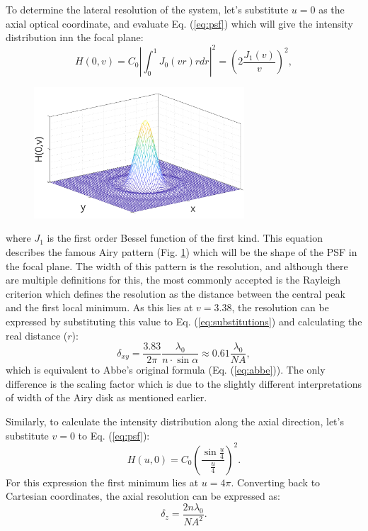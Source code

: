     To determine the lateral resolution of the system, let's substitute $u=0$ as the axial optical coordinate, and evaluate Eq. (\ref{eq:psf}) which will give the intensity distribution inn the focal plane:
    \begin{equation}
      H(0,v) = C_0 \left| \int_0^1 J_0(vr)rdr \right|^2 = \left(2\frac{J_1(v)}{v} \right) ^2,
      \label{eq:airy}
    \end{equation}
    \begin{figure}
      \centering
      \includegraphics[width=0.7\textwidth]{airy}
      \label{fig:airy}
    \end{figure}


    

    where $J_1$ is the first order Bessel function of the first kind. This equation describes the famous Airy pattern (Fig. \ref{fig:airy}) which will be the shape of the PSF in the focal plane. The width of this pattern is the resolution, and although there are multiple definitions for this, the most commonly accepted is the Rayleigh criterion \cite{f.r.s_xxxi._1879, born_principles_2013} which defines the resolution as the distance between the central peak and the first local minimum. As this lies at $v=3.38$, the resolution can be expressed by substituting this value to Eq. (\ref{eq:substitutions}) and calculating the real distance ($r$):
    \begin{equation}
      \delta_{xy} = \frac{3.83}{2\pi} \frac{\lambda_0}{n\cdot \sin \alpha} \approx 0.61 \frac{\lambda_0}{NA},
      \label{eq:lateralRes}
    \end{equation}
    which is equivalent to Abbe's original formula (Eq. (\ref{eq:abbe})). The only difference is the scaling factor which is due to the slightly different interpretations of width of the Airy disk as mentioned earlier.

    Similarly, to calculate the intensity distribution along the axial direction, let's substitute $v=0$ to Eq. (\ref{eq:psf}):
    \begin{equation}
      H(u,0)=C_0\left( \frac{\sin \frac{u}{4}}{\frac{u}{4}}\right) ^2 . 
    \end{equation} 
    For this expression the first minimum lies at $u=4\pi$. Converting back to Cartesian coordinates, the axial resolution can be expressed as:
    \begin{equation}
      \delta_z = \frac{2n\lambda_0}{NA^2}.
      \label{eq:axialRes}
    \end{equation}

